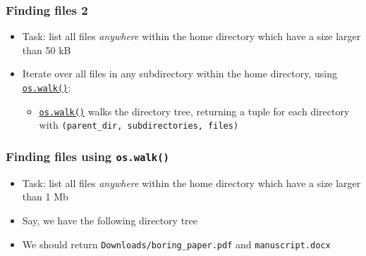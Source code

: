 \documentclass[xcolor=table]{beamer}
\begin{document}

\begin{frame}[fragile]
    \frametitle{Finding files 2}
    \begin{itemize}\addtolength{\itemsep}{1\baselineskip}
        \item Task: list all files \emph{anywhere} within the home directory which have a size larger than 50 kB \pause
        \item Iterate over all files in any subdirectory within the home directory, using \href{https://docs.python.org/3/library/os.html#os.walk}{\texttt{os.walk()}}: \pause
    \begin{itemize}
        \item \href{https://docs.python.org/3/library/os.html#os.walk}{\texttt{os.walk()}} walks the directory tree, returning a tuple for each directory with \texttt{(parent\_dir, subdirectories, files)}
    \end{itemize}
    \end{itemize}
\end{frame}


\begin{frame}[fragile]
    \frametitle{Finding files using \texttt{os.walk()}}
    \begin{itemize}
        \item Task: list all files \emph{anywhere} within the home directory which have a size larger than 1 Mb \pause
        \item
    Say, we have the following directory tree
             \pause
        \item We should return \texttt{Downloads/boring\_paper.pdf} and \texttt{manuscript.docx}
        \end{itemize}
\end{frame}

\end{document}
